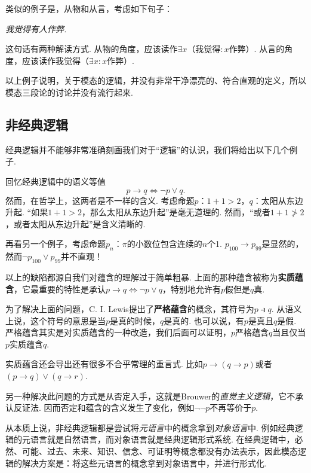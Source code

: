  类似的例子是，从物和从言，考虑如下句子：
\begin{center}
\itshape 我觉得有人作弊.
\end{center}
这句话有两种解读方式. 从物的角度，应该读作$\exists x$（我觉得$:x$作弊）. 从言的角度，应该读作我觉得（$\exists x:x$作弊）.

以上例子说明，关于模态的逻辑，并没有非常干净漂亮的、符合直观的定义，所以模态三段论的讨论并没有流行起来. 
    
\subsection{非经典逻辑}
经典逻辑并不能够非常准确刻画我们对于“逻辑”的认识，我们将给出以下几个例子. 

回忆经典逻辑中的语义等值
        \[p\to q\iff\neg p\vee q.\]
然而，在哲学上，这两者是不一样的含义. 考虑命题$p$：$1+1>2$，$q$：太阳从东边升起. “如果$1+1>2$，那么太阳从东边升起”是毫无道理的. 然而，“或者$1+1\not>2$，或者太阳从东边升起”是含义清晰的.

再看另一个例子，考虑命题$p_n$：$\pi$的小数位包含连续的$n$个1. $p_{100}\to p_{99}$是显然的，然而$\neg p_{100}\vee p_{99}$并不直观！
    
以上的缺陷都源自我们对蕴含的理解过于简单粗暴. 上面的那种蕴含被称为\textbf{实质蕴含}，它最重要的特性是承认$p\rightarrow q \iff
\lnot {p}\vee q$，特别地允许有$p$假但是$q$真.

为了解决上面的问题，C. I. Lewis提出了\textbf{严格蕴含}的概念，其符号为$p\strictif q$. 从语义上说，这个符号的意思是当$p$是真的时候，$q$是真的. 也可以说，有$p$是真且$q$是假. 严格蕴含其实是对实质蕴含的一种改造，我们后面可以证明，$p$严格蕴含$q$当且仅当 $p$实质蕴含$q$.
    
实质蕴含还会导出还有很多不合乎常理的重言式. 比如$p\to(q\to p)$或者$(p\to q)\vee (q\to r)$.

另一种解决此问题的方式是从否定入手，这就是Brouwer的\emph{直觉主义逻辑}，它不承认反证法. 因而否定和蕴含的含义发生了变化，例如$\neg\neg p$不再等价于$p$. 
    
从本质上说，非经典逻辑都是尝试将\emph{元语言}中的概念拿到\emph{对象语言}中. 例如经典逻辑的元语言就是自然语言，而对象语言就是经典逻辑形式系统. 在经典逻辑中，必然、可能、过去、未来、知识、信念、可证明等概念都没有办法表示，因此模态逻辑的解决方案是：将这些元语言的概念拿到对象语言中，并进行形式化. 
    
